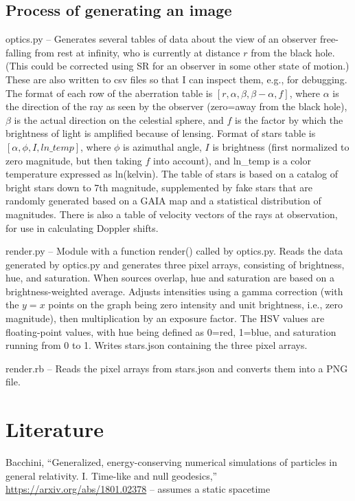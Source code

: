 \documentclass{article}
\begin{document}
\subsection{Process of generating an image}

optics.py -- Generates several tables of data about the view of an observer free-falling from rest at infinity,
who is currently at distance $r$ from the black hole.
(This could be corrected using SR for an observer in some other state of motion.) These are also
written to csv files so that I can inspect them, e.g., for debugging.
The format of
each row of the aberration table is $[r,\alpha,\beta,\beta-\alpha,f]$, where $\alpha$ is the direction
of the ray as seen by the observer (zero=away from the black hole), $\beta$ is the actual direction
on the celestial sphere, and $f$ is the factor by which the brightness of light is amplified because
of lensing. Format of stars table is $[\alpha,\phi,I,ln\_temp]$, where $\phi$ is azimuthal angle, $I$ is
brightness (first normalized to zero magnitude, but then taking $f$ into account), and ln\_temp is
a color temperature expressed as ln(kelvin).
The table of stars is based on a catalog of bright stars down to 7th magnitude, supplemented by
fake stars that are randomly generated based on a GAIA map and a statistical distribution of
magnitudes. There is also a table of velocity vectors of the rays at observation, for use in
calculating Doppler shifts.

render.py -- Module with a function render() called by optics.py.
Reads the data generated by optics.py and generates three pixel arrays, consisting of
brightness, hue, and saturation. When sources overlap, hue and saturation are based on a brightness-weighted
average. Adjusts intensities using a gamma correction (with the $y=x$ points on the graph being
zero intensity and unit brightness, i.e., zero magnitude), then multiplication by an exposure factor.
The HSV values are floating-point values, with hue being defined as 0=red, 1=blue,
and saturation running from 0 to 1. Writes stars.json containing the three pixel arrays.

render.rb -- Reads the pixel arrays from stars.json and converts them into a PNG file.

\section{Literature}

Bacchini, ``Generalized, energy-conserving numerical simulations of particles
in general relativity. I. Time-like and null geodesics,''
\url{https://arxiv.org/abs/1801.02378} -- assumes a static spacetime
\end{document}
